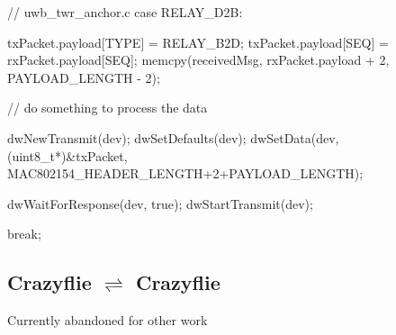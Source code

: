\documentclass[]{article}
\begin{document}
\begin{C}
// uwb_twr_anchor.c
case RELAY_D2B:
{      
	txPacket.payload[TYPE] = RELAY_B2D;
	txPacket.payload[SEQ] = rxPacket.payload[SEQ];
	memcpy(receivedMsg, rxPacket.payload + 2, PAYLOAD_LENGTH - 2);
	
	// do something to process the data
	
	dwNewTransmit(dev);
	dwSetDefaults(dev);
	dwSetData(dev, (uint8_t*)&txPacket, MAC802154_HEADER_LENGTH+2+PAYLOAD_LENGTH);
	
	dwWaitForResponse(dev, true);
	dwStartTransmit(dev);
	
	break;
}
\end{C}

\subsection{\texorpdfstring{Crazyflie $\rightleftharpoons$ Crazyflie}%
	{Between Crazyflie and Crazyflie}}

\noindent Currently abandoned for other work
\end{document}
